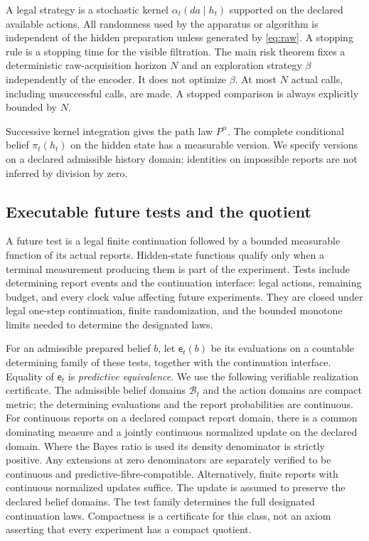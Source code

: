 A legal strategy is a stochastic kernel $\alpha_t(da\mid h_t)$ supported on the declared available actions. All randomness used by the apparatus or algorithm is independent of the hidden preparation unless generated by \eqref{eq:raw}. A stopping rule is a stopping time for the visible filtration. The main risk theorem fixes a deterministic raw-acquisition horizon $N$ and an exploration strategy $\beta$ independently of the encoder. It does not optimize $\beta$. At most $N$ actual calls, including unsuccessful calls, are made. A stopped comparison is always explicitly bounded by $N$.

Successive kernel integration gives the path law $P^\alpha$. The complete conditional belief $\pi_t(h_t)$ on the hidden state has a measurable version. We specify versions on a declared admissible history domain; identities on impossible reports are not inferred by division by zero.

\subsection{Executable future tests and the quotient}
A future test is a legal finite continuation followed by a bounded measurable function of its actual reports. Hidden-state functions qualify only when a terminal measurement producing them is part of the experiment. Tests include determining report events and the continuation interface: legal actions, remaining budget, and every clock value affecting future experiments. They are closed under legal one-step continuation, finite randomization, and the bounded monotone limits needed to determine the designated laws.

For an admissible prepared belief $b$, let $\mathsf e_t(b)$ be its evaluations on a countable determining family of these tests, together with the continuation interface. Equality of $\mathsf e_t$ is \emph{predictive equivalence}. We use the following verifiable realization certificate. The admissible belief domains $\mathcal B_t$ and the action domains are compact metric; the determining evaluations and the report probabilities are continuous. For continuous reports on a declared compact report domain, there is a common dominating measure and a jointly continuous normalized update on the declared domain. Where the Bayes ratio is used its density denominator is strictly positive. Any extensions at zero denominators are separately verified to be continuous and predictive-fibre-compatible. Alternatively, finite reports with continuous normalized updates suffice. The update is assumed to preserve the declared belief domains. The test family determines the full designated continuation laws. Compactness is a certificate for this class, not an axiom asserting that every experiment has a compact quotient.


